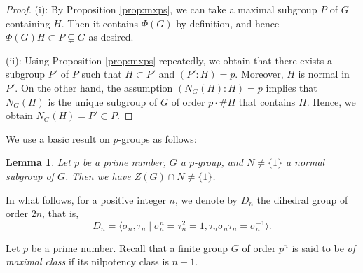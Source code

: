 \documentclass[12pt]{amsart}
\theoremstyle{plain}
\newtheorem{lem}[thm]{Lemma}
\theoremstyle{definition}
\numberwithin{thm}{section}
\numberwithin{equation}{section}
\newcommand{\Z}{\mathbb{Z}}
\begin{document}
\begin{proof}
(i): By Proposition \ref{prop:mxps}, we can take a maximal subgroup $P$ of $G$ containing $H$. Then it contains $\Phi(G)$ by definition, and hence $\Phi(G)H\subset P\subsetneq G$ as desired. 

(ii): %
Using Proposition \ref{prop:mxps} repeatedly, we obtain that there exists a subgroup $P'$ of $P$ such that $H\subset P'$ and $(P':H)=p$. Moreover, $H$ is normal in $P'$. On the other hand, the assumption $(N_{G}(H):H)=p$ implies that $N_{G}(H)$ is the unique subgroup of $G$ of order $p\cdot \#H$ that contains $H$. Hence, we obtain $N_{G}(H)=P'\subset P$. 
\end{proof}

We use a basic result on $p$-groups as follows:

\begin{lem}\label{lem:nznt}
Let $p$ be a prime number, $G$ a $p$-group, and $N\neq \{1\}$ a normal subgroup of $G$. Then we have $Z(G)\cap N\neq\{1\}$.
\end{lem}

In what follows, for a positive integer $n$, we denote by $D_{n}$ the dihedral group of order $2n$, that is,
\begin{equation*}
    D_{n}=\langle \sigma_{n},\tau_{n}\mid \sigma_{n}^{n}=\tau_{n}^{2}=1,\tau_{n}\sigma_{n}\tau_{n}=\sigma_{n}^{-1} \rangle. 
\end{equation*}

Let $p$ be a prime number. Recall that a finite group $G$ of order $p^{n}$ is said to be \emph{of maximal class} if its nilpotency class is $n-1$. 
\end{document}

